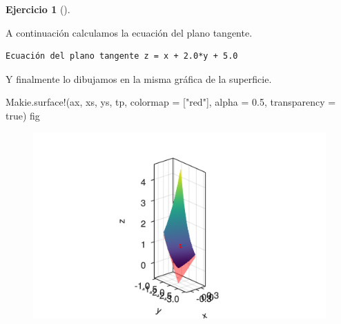 \documentclass[
  a4paper,
]{scrreport}
\newenvironment{Shaded}{\begin{snugshade}}{\end{snugshade}}
\newcommand{\BuiltInTok}[1]{\textcolor[rgb]{0.00,0.23,0.31}{#1}}
\newcommand{\ConstantTok}[1]{\textcolor[rgb]{0.56,0.35,0.01}{#1}}
\newcommand{\FloatTok}[1]{\textcolor[rgb]{0.68,0.00,0.00}{#1}}
\newcommand{\FunctionTok}[1]{\textcolor[rgb]{0.28,0.35,0.67}{#1}}
\newcommand{\ImportTok}[1]{\textcolor[rgb]{0.00,0.46,0.62}{#1}}
\newcommand{\NormalTok}[1]{\textcolor[rgb]{0.00,0.23,0.31}{#1}}
\newcommand{\OperatorTok}[1]{\textcolor[rgb]{0.37,0.37,0.37}{#1}}
\newcommand{\SpecialCharTok}[1]{\textcolor[rgb]{0.37,0.37,0.37}{#1}}
\newcommand{\StringTok}[1]{\textcolor[rgb]{0.13,0.47,0.30}{#1}}
\theoremstyle{definition}
\newtheorem{exercise}{Ejercicio}[chapter]
\theoremstyle{remark}
\begin{document}
\begin{exercise}[]
\begin{tcolorbox}
\begin{figure}[H]
{}

\end{figure}

A continuación calculamos la ecuación del plano tangente.

\begin{Shaded}
\end{Shaded}

\begin{verbatim}
Ecuación del plano tangente z = x + 2.0*y + 5.0
\end{verbatim}

Y finalmente lo dibujamos en la misma gráfica de la superficie.

\begin{Shaded}
\begin{Highlighting}[]
\NormalTok{Makie.}\FunctionTok{surface!}\NormalTok{(ax, xs, ys, tp, colormap }\OperatorTok{=}\NormalTok{ [}\StringTok{"red"}\NormalTok{], alpha }\OperatorTok{=} \FloatTok{0.5}\NormalTok{, transparency }\OperatorTok{=} \ConstantTok{true}\NormalTok{)}
\NormalTok{fig}
\end{Highlighting}
\end{Shaded}

\begin{figure}[H]

{\centering \includegraphics{09-derivadas-funciones-varias-variables_files/figure-pdf/cell-32-output-1.png}

}
\end{figure}
\end{tcolorbox}
\end{exercise}
\end{document}
